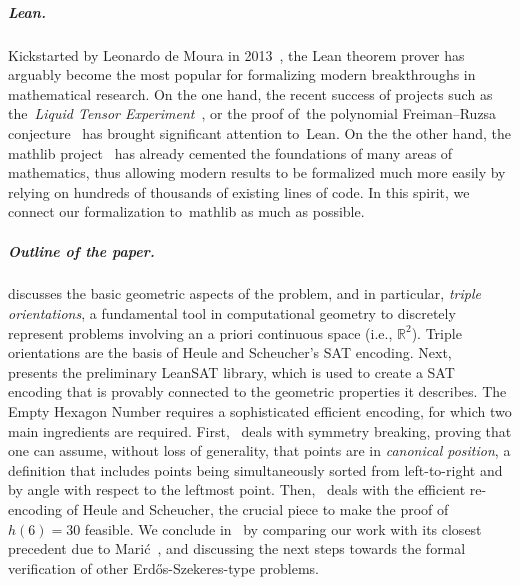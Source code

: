 \subparagraph*{Lean.} Kickstarted by Leonardo de Moura in 2013~\cite{demouraLeanTheoremProver2015}, the Lean theorem prover has arguably become the most popular for formalizing modern breakthroughs in mathematical research. 
On the one hand, the recent success of projects such as the~\emph{Liquid Tensor Experiment}~\cite{Castelvecchi2021}, or the proof of~the polynomial Freiman–Ruzsa conjecture~\cite{gowers2023conjecture, slomanATeamMathProves2023} has brought significant attention to~Lean. %
On the the other hand, the \textsf{mathlib} project~\cite{The_mathlib_Community_2020} has already cemented the foundations of many areas of mathematics, thus allowing modern results to be formalized much more easily by relying on hundreds of thousands of existing lines of code. In this spirit, we connect our formalization to~\textsf{mathlib} as much as possible.

\subparagraph*{Outline of the paper.}  discusses the basic geometric aspects of the problem, and in particular, \emph{triple orientations}, a fundamental tool in computational geometry to discretely represent problems involving an a priori continuous space (i.e., $\mathbb{R}^2$). Triple orientations are the basis of Heule and Scheucher's SAT encoding.
Next,~ presents the preliminary \textsf{LeanSAT} library, which is used to create a SAT encoding that is provably connected to the geometric properties it describes.
The Empty Hexagon Number requires a sophisticated efficient encoding, for which two main ingredients are required. First,~ deals with symmetry breaking, proving that one can assume, without loss of generality, that points are in \emph{canonical position}, a definition that includes points being simultaneously sorted from left-to-right and by angle with respect to the leftmost point. 
Then,~ deals with the efficient re-encoding of Heule and Scheucher, the crucial piece to make the proof of $h(6) = 30$ feasible. We conclude in~ by comparing our work with its closest precedent due to Marić~\cite{19maric_fast_formal_proof_erdos_szekeres_conjecture_convex_polygons_most_six_points}, and discussing the next steps towards the formal verification of other Erd\H{o}s-Szekeres-type problems.

